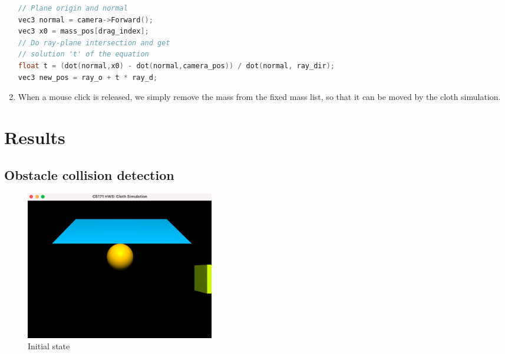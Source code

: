 \documentclass[acmtog]{acmart}
\begin{document}
\begin{enumerate}
	\begin{lstlisting}[language=C++]
// Plane origin and normal
vec3 normal = camera->Forward();
vec3 x0 = mass_pos[drag_index];
// Do ray-plane intersection and get 
// solution 't' of the equation
float t = (dot(normal,x0) - dot(normal,camera_pos)) / dot(normal, ray_dir);
vec3 new_pos = ray_o + t * ray_d;
	\end{lstlisting}

	\item When a mouse click is released, we simply remove the mass from the fixed mass list, so that it can be moved by the cloth simulation.
\end{enumerate}


\section{Results}

\subsection{Obstacle collision detection}

\begin{figure}[H]
	\centering
	\includegraphics[width=0.4\textwidth]{results/1-initial-state.jpg}
	\caption{Initial state}
\end{figure}
\end{document}
